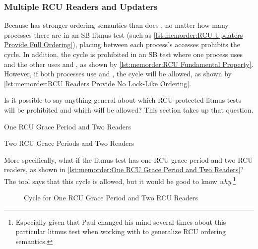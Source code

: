 \subsubsection{Multiple RCU Readers and Updaters}
\label{sec:memorder:Multiple RCU Readers and Updaters}

Because  has stronger ordering semantics than does
, no matter how many processes there are in an SB
litmus test (such as \cref{lst:memorder:RCU Updaters Provide Full Ordering}),
placing  between each process's
accesses prohibits the cycle.
In addition, the cycle is prohibited in an SB test where one process
uses  and the other uses  and
, as shown by
\cref{lst:memorder:RCU Fundamental Property}.
However, if both processes use  and
, the cycle will be allowed, as shown by
\cref{lst:memorder:RCU Readers Provide No Lock-Like Ordering}.

Is it possible to say anything general about which RCU-protected
litmus tests will be prohibited and which will be allowed?
This section takes up that question.

\begin{listing}

\caption{One RCU Grace Period and Two Readers}
\label{lst:memorder:One RCU Grace Period and Two Readers}
\end{listing}

\begin{listing}

\caption{Two RCU Grace Periods and Two Readers}
\label{lst:memorder:Two RCU Grace Periods and Two Readers}
\end{listing}

More specifically, what if the litmus test has one RCU grace
period and two RCU readers, as shown in
\cref{lst:memorder:One RCU Grace Period and Two Readers}?
The  tool says that this cycle is allowed, but it would be
good to know \emph{why}.\footnote{
	Especially given that Paul changed his mind several times about
	this particular litmus test when working with  to
	generalize RCU ordering semantics.}

\begin{figure}
\centering
{}
\caption{Cycle for One RCU Grace Period and Two RCU Readers}
\label{fig:memorder:Cycle for One RCU Grace Period and Two RCU Readers}
\end{figure}

